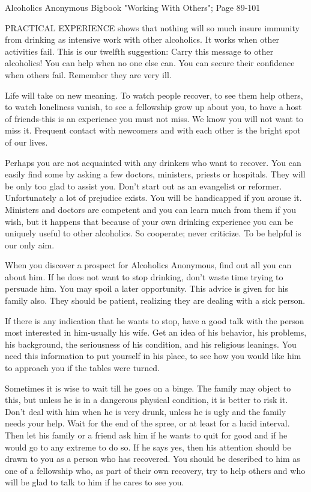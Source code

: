 
Alcoholics Anonymous Bigbook "Working With Others"; Page 89-101

\begin{biblechapter}
PRACTICAL EXPERIENCE shows that nothing will so much insure immunity from drinking as intensive work with other alcoholics.  It works when other activities fail.  This is our twelfth suggestion: Carry this message to other alcoholics!  You can help when no one else can.  You can secure their confidence when others fail.  Remember they are very ill.

Life will take on new meaning.  To watch people recover, to see them help others, to watch loneliness vanish, to see a fellowship grow up about you, to have a host of friends-this is an experience you must not miss.  We know you will not want to miss it.  Frequent contact with newcomers and with each other is the bright spot of our lives.

Perhaps you are not acquainted with any drinkers who want to recover.  You can easily find some by asking a few doctors, ministers, priests or hospitals.  They will be only too glad to assist you.  Don't start out as an evangelist or reformer.  Unfortunately a lot of prejudice exists.  You will be handicapped if you arouse it.  Ministers and doctors are competent and you can learn much from them if you wish, but it happens that because of your own drinking experience you can be uniquely useful to other alcoholics.  So cooperate; never criticize.  To be helpful is our only aim.

When you discover a prospect for Alcoholics Anonymous, find out all you can about him.  If he does not want to stop drinking, don't waste time trying to persuade him.  You may spoil a later opportunity.  This advice is given for his family also.  They should be patient, realizing they are dealing with a sick person.

If there is any indication that he wants to stop,  have a good talk with the person most interested in him-usually his wife.  Get an idea of his behavior, his problems, his background, the seriousness of his condition, and his religious leanings.  You need this information to put yourself in his place, to see how you would like him to approach you if the tables were turned.

Sometimes it is wise to wait till he goes on a binge.  The family may object to this, but unless he is in a dangerous physical condition, it is better to risk it.  Don't deal with him when he is very drunk, unless he is ugly and the family needs your help.  Wait for the end of the spree, or at least for a lucid interval.  Then let his family or a friend ask him if he wants to quit for good and if he would go to any extreme to do so.  If he says yes, then his attention should be drawn to you as a person who has recovered.  You should be described to him as one of a fellowship who, as part of their own recovery, try to help others and who will be glad to talk to him if he cares to see you.


\end{biblechapter}
